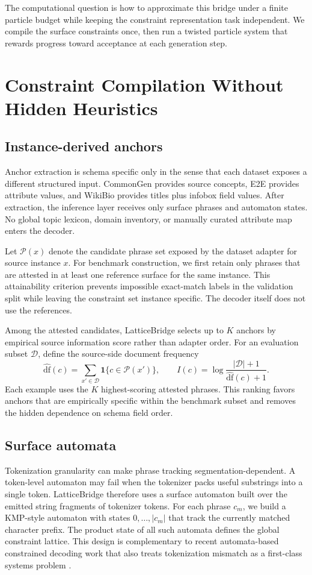 \documentclass[11pt]{article}
\begin{document}
The computational question is how to approximate this bridge under a finite particle budget while keeping the constraint representation task independent. We compile the surface constraints once, then run a twisted particle system that rewards progress toward acceptance at each generation step.

\section{Constraint Compilation Without Hidden Heuristics}
\subsection{Instance-derived anchors}
Anchor extraction is schema specific only in the sense that each dataset exposes a different structured input. CommonGen provides source concepts, E2E provides attribute values, and WikiBio provides titles plus infobox field values. After extraction, the inference layer receives only surface phrases and automaton states. No global topic lexicon, domain inventory, or manually curated attribute map enters the decoder.

Let $\mathcal{P}(x)$ denote the candidate phrase set exposed by the dataset adapter for source instance $x$. For benchmark construction, we first retain only phrases that are attested in at least one reference surface for the same instance. This attainability criterion prevents impossible exact-match labels in the validation split while leaving the constraint set instance specific. The decoder itself does not use the references.

Among the attested candidates, LatticeBridge selects up to $K$ anchors by empirical source information score rather than adapter order. For an evaluation subset $\mathcal{D}$, define the source-side document frequency
\[
\widehat{\mathrm{df}}(c)
=
\sum_{x' \in \mathcal{D}}
\mathbf{1}\{c \in \mathcal{P}(x')\},
\qquad
I(c)
=
\log \frac{|\mathcal{D}| + 1}{\widehat{\mathrm{df}}(c) + 1}.
\]
Each example uses the $K$ highest-scoring attested phrases. This ranking favors anchors that are empirically specific within the benchmark subset and removes the hidden dependence on schema field order.

\subsection{Surface automata}
Tokenization granularity can make phrase tracking segmentation-dependent. A token-level automaton may fail when the tokenizer packs useful substrings into a single token. LatticeBridge therefore uses a surface automaton built over the emitted string fragments of tokenizer tokens. For each phrase $c_m$, we build a KMP-style automaton with states $0,\dots,\lvert c_m\rvert$ that track the currently matched character prefix. The product state of all such automata defines the global constraint lattice. This design is complementary to recent automata-based constrained decoding work that also treats tokenization mismatch as a first-class systems problem \citep{koo2024automata}.
\end{document}
